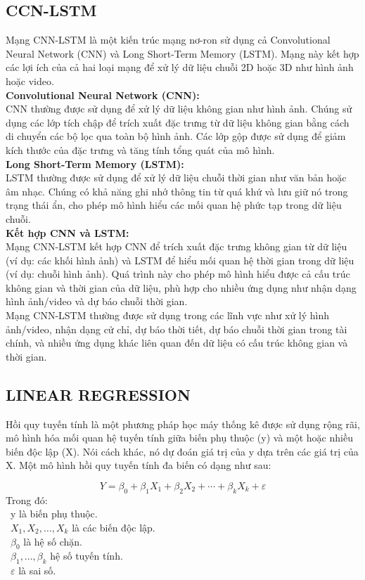 \documentclass[conference]{IEEEtran}
\begin{document}
\subsection{CCN-LSTM}
Mạng CNN-LSTM là một kiến trúc mạng nơ-ron sử dụng cả Convolutional Neural Network (CNN) và Long Short-Term Memory (LSTM). Mạng này kết hợp các lợi ích của cả hai loại mạng để xử lý dữ liệu chuỗi 2D hoặc 3D như hình ảnh hoặc video.\\
\textbf{Convolutional Neural Network (CNN):}\\
CNN thường được sử dụng để xử lý dữ liệu không gian như hình ảnh. Chúng sử dụng các lớp tích chập để trích xuất đặc trưng từ dữ liệu không gian bằng cách di chuyển các bộ lọc qua toàn bộ hình ảnh. Các lớp gộp được sử dụng để giảm kích thước của đặc trưng và tăng tính tổng quát của mô hình.\\
\textbf{Long Short-Term Memory (LSTM):}\\
LSTM thường được sử dụng để xử lý dữ liệu chuỗi thời gian như văn bản hoặc âm nhạc. Chúng có khả năng ghi nhớ thông tin từ quá khứ và lưu giữ nó trong trạng thái ẩn, cho phép mô hình hiểu các mối quan hệ phức tạp trong dữ liệu chuỗi.\\
\textbf{Kết hợp CNN và LSTM:}\\
Mạng CNN-LSTM kết hợp CNN để trích xuất đặc trưng không gian từ dữ liệu (ví dụ: các khối hình ảnh) và LSTM để hiểu mối quan hệ thời gian trong dữ liệu (ví dụ: chuỗi hình ảnh). Quá trình này cho phép mô hình hiểu được cả cấu trúc không gian và thời gian của dữ liệu, phù hợp cho nhiều ứng dụng như nhận dạng hình ảnh/video và dự báo chuỗi thời gian.\\
Mạng CNN-LSTM thường được sử dụng trong các lĩnh vực như xử lý hình ảnh/video, nhận dạng cử chỉ, dự báo thời tiết, dự báo chuỗi thời gian trong tài chính, và nhiều ứng dụng khác liên quan đến dữ liệu có cấu trúc không gian và thời gian.
\subsection{LINEAR REGRESSION}
Hồi quy tuyến tính là một phương pháp học máy thống kê được sử dụng rộng rãi, mô hình hóa mối quan hệ tuyến tính giữa biến phụ thuộc (y) và một hoặc nhiều biến độc lập (X). Nói cách khác, nó dự đoán giá trị của y dựa trên các giá trị của X. Một mô hình hồi quy tuyến tính đa biến có dạng như sau:

\[Y=\beta_0+\beta_1X_1+\beta_2X_2+\cdots+\beta_kX_k+\varepsilon\]
Trong đó:\\
	\indent\textbullet\ y là biến phụ thuộc.\\
	\indent\textbullet\ \(X_1, X_2, \ldots, X_k\) là các biến độc lập.\\
	\indent\textbullet\ \(\beta_0\) là hệ số chặn.\\
	\indent\textbullet\ \(\beta_1,..., \beta_k\) hệ số tuyến tính.\\
	\indent\textbullet\ \(\varepsilon\) là sai số.
\end{document}
